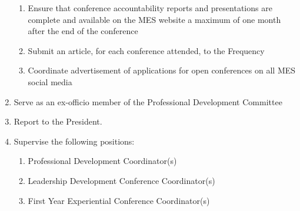 \begin{enumerate}
  \begin{enumerate}
   \item
    Ensure that conference accountability reports and presentations are
    complete and available on the MES website a maximum of one month
    after the end of the conference
   \item
    Submit an article, for each conference attended, to the Frequency
   \item
    Coordinate advertisement of applications for open conferences on all
    MES social media
  \end{enumerate}
 \item
  Serve as an ex-officio member of the Professional Development
  Committee
 \item
  Report to the President.
 \item
  Supervise the following positions:

  \begin{enumerate}
   \item
    Professional Development Coordinator(s)
   \item
    Leadership Development Conference Coordinator(s)
   \item
    First Year Experiential Conference Coordinator(s)

  \end{enumerate}
\end{enumerate}